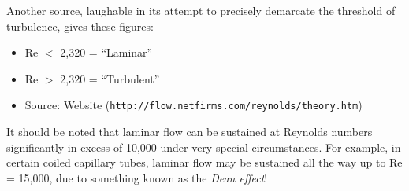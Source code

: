 \goodbreak

Another source, laughable in its attempt to precisely demarcate the threshold of turbulence, gives these figures:

\begin{itemize}
\item{} Re $<$ 2,320 = ``Laminar''
\item{} Re $>$ 2,320 = ``Turbulent''
\item{} Source: Website ({\tt http://flow.netfirms.com/reynolds/theory.htm})
\end{itemize}

It should be noted that laminar flow can be sustained at Reynolds numbers significantly in excess of 10,000 under very special circumstances.  For example, in certain coiled capillary tubes, laminar flow may be sustained all the way up to Re = 15,000, due to something known as the {\it Dean effect}!











